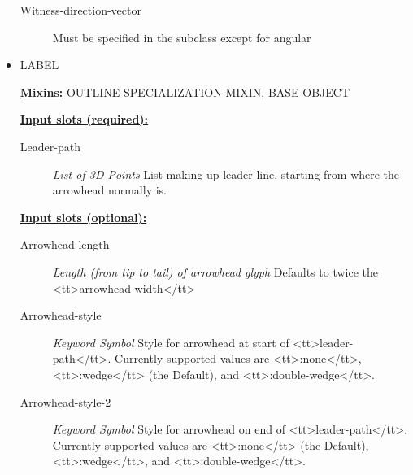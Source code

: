 \documentclass [11pt]{book}
\begin{document}
\begin{itemize}
\begin{description}
\item [Witness-direction-vector]
Must be specified in the subclass except for angular


\end{description}







\item {}LABEL


\textbf{
\underline{Mixins:}} OUTLINE-SPECIALIZATION-MIXIN, BASE-OBJECT





\begin{description}

\end{description}








\textbf{
\underline{Input slots (required):}}

\begin{description}

\item [Leader-path]
\emph{List of 3D Points} List making up leader line, starting from where the arrowhead normally is.


\end{description}






\textbf{
\underline{Input slots (optional):}}

\begin{description}

\item [Arrowhead-length]
\emph{Length (from tip to tail) of arrowhead glyph} Defaults to twice the <tt>arrowhead-width</tt>


\item [Arrowhead-style]
\emph{Keyword Symbol} Style for arrowhead at start of <tt>leader-path</tt>. Currently supported values
are <tt>:none</tt>, <tt>:wedge</tt>  (the Default), and <tt>:double-wedge</tt>.


\item [Arrowhead-style-2]
\emph{Keyword Symbol} Style for arrowhead on end of <tt>leader-path</tt>. Currently supported values
are <tt>:none</tt> (the Default), <tt>:wedge</tt>, and <tt>:double-wedge</tt>.



\end{description}
\end{itemize}
\end{document}
